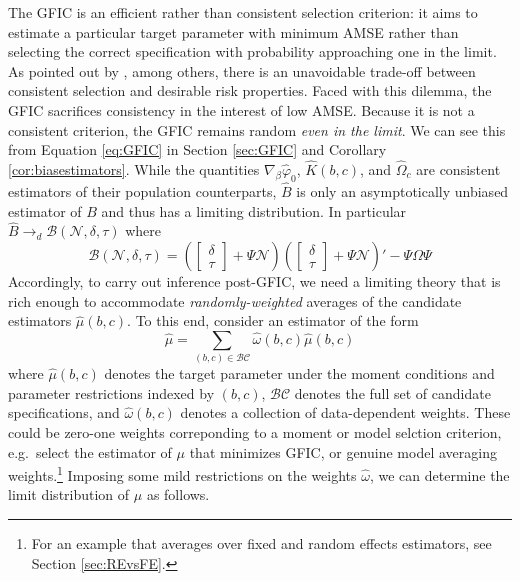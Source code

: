 The GFIC is an efficient rather than consistent selection criterion: it aims to estimate a particular target parameter with minimum AMSE rather than selecting the correct specification with probability approaching one in the limit.
As pointed out by \cite{Yang2005}, among others, there is an unavoidable trade-off between consistent selection and desirable risk properties.
Faced with this dilemma, the GFIC sacrifices consistency in the interest of low AMSE.
Because it is not a consistent criterion, the GFIC remains random \emph{even in the limit}.
We can see this from Equation \ref{eq:GFIC} in Section \ref{sec:GFIC} and Corollary \ref{cor:biasestimators}.
While the quantities $\nabla_\beta \widehat{\varphi}_0$, $\widehat{K}(b,c)$, and $\widehat{\Omega}_c$ are consistent estimators of their population counterparts, $\widehat{B}$ is only an asymptotically unbiased estimator of $B$ and thus has a limiting distribution.
In particular $\widehat{B} \rightarrow_d \mathscr{B}(\mathscr{N}, \delta, \tau)$ where
\begin{equation}
  \mathscr{B}(\mathscr{N}, \delta, \tau) = 
  \left(\left[
  \begin{array}{c}
    \delta \\ \tau
  \end{array}
\right] + \Psi \mathscr{N}\right)
  \left(\left[
  \begin{array}{c}
    \delta \\ \tau
  \end{array}
\right] + \Psi \mathscr{N}\right)' - \Psi \Omega \Psi
\end{equation}
Accordingly, to carry out inference post-GFIC, we need a limiting theory that is rich enough to accommodate \emph{randomly-weighted} averages of the candidate estimators $\widehat{\mu}(b,c)$.
To this end, consider an estimator of the form 
	$$\widehat{\mu} = \sum_{(b,c) \in \mathcal{BC}} \widehat{\omega}(b,c) \widehat{\mu}(b,c)$$
where $\widehat{\mu}(b,c)$ denotes the target parameter under the moment conditions and parameter restrictions indexed by $(b,c)$, $\mathcal{BC}$ denotes the full set of candidate specifications, and $\widehat{\omega}(b,c)$ denotes a collection of data-dependent weights.
These could be zero-one weights correponding to a moment or model selction criterion, e.g.\ select the estimator of $\mu$ that minimizes GFIC, or genuine model averaging weights.\footnote{For an example that averages over fixed and random effects estimators, see Section \ref{sec:REvsFE}.}
Imposing some mild restrictions on the weights $\widehat{\omega}$, we can determine the limit distribution of $\mu$ as follows.
